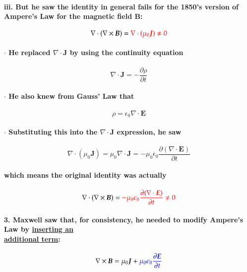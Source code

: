 \documentclass{article}
\begin{document}
\paragraph{\indent\indent iii. But he saw the identity in general fails for the 1850's version of Ampere's Law for the magnetic field $\boldsymbol{B}$:}
\begin{equation*}
    \nabla\cdot(\nabla\times\boldsymbol{B})=\textcolor{red}{\nabla\cdot(\mu_0\boldsymbol{J})\neq 0}
\end{equation*}
\paragraph{\indent\indent $\cdot$ He replaced $\nabla\cdot\boldsymbol{J}$ by using the continuity equation}
\begin{equation*}
    \nabla\cdot\boldsymbol{J}=-\frac{\partial \rho}{\partial t}
\end{equation*}
\paragraph{\indent\indent $\cdot$ He also knew from Gauss' Law that}
\begin{equation*}
    \rho=\epsilon_0\nabla\cdot\boldsymbol{E}
\end{equation*}
\paragraph{\indent\indent $\cdot$ Substituting this into the $\nabla\cdot\boldsymbol{J}$ expression, he saw}
\begin{equation*}
    \nabla\cdot(\mu_0\boldsymbol{J})=\mu_0\nabla\cdot\boldsymbol{J}=-\mu_0\epsilon_0\frac{\partial(\nabla\cdot\boldsymbol{E})}{\partial t}
\end{equation*}
\paragraph{\indent\indent which means the original identity was actually}
\begin{equation*}
    \nabla\cdot(\nabla\times\boldsymbol{B})=\textcolor{red}{-\mu_0\epsilon_0\frac{\partial(\nabla\cdot\boldsymbol{E})}{\partial t}\neq 0}
\end{equation*}
\paragraph{3. Maxwell saw that, for consistency, he needed to modify Ampere's Law by \underline{inserting an} \\\underline{additional term}:}
\begin{equation*}
    \nabla\times\boldsymbol{B}=\mu_0\boldsymbol{J}+\textcolor{blue}{\mu_0\epsilon_0\frac{\partial \boldsymbol{E}}{\partial t}}
\end{equation*}
\end{document}
